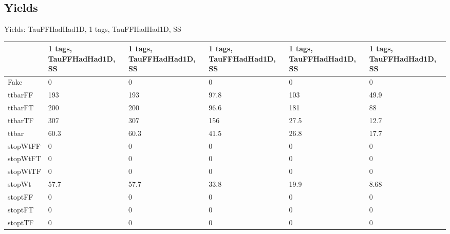 
\subsection{Yields}

\begin{frame}{Yields: TauFFHadHad1D, 1 tags, TauFFHadHad1D, SS}
\begin{center}
  \begin{tabular}{l| >{\centering\let\newline\\\arraybackslash\hspace{0pt}}m{1.4cm}| >{\centering\let\newline\\\arraybackslash\hspace{0pt}}m{1.4cm}| >{\centering\let\newline\\\arraybackslash\hspace{0pt}}m{1.4cm}| >{\centering\let\newline\\\arraybackslash\hspace{0pt}}m{1.4cm}| >{\centering\let\newline\\\arraybackslash\hspace{0pt}}m{1.4cm}}
    & 1 tags, TauFFHadHad1D, SS & 1 tags, TauFFHadHad1D, SS & 1 tags, TauFFHadHad1D, SS & 1 tags, TauFFHadHad1D, SS & 1 tags, TauFFHadHad1D, SS \\
 \hline \hline
    Fake& 0 & 0 & 0 & 0 & 0 \\
 \hline
    ttbarFF& 193 & 193 & 97.8 & 103 & 49.9 \\
 \hline
    ttbarFT& 200 & 200 & 96.6 & 181 & 88 \\
 \hline
    ttbarTF& 307 & 307 & 156 & 27.5 & 12.7 \\
 \hline
    ttbar& 60.3 & 60.3 & 41.5 & 26.8 & 17.7 \\
 \hline
    stopWtFF& 0 & 0 & 0 & 0 & 0 \\
 \hline
    stopWtFT& 0 & 0 & 0 & 0 & 0 \\
 \hline
    stopWtTF& 0 & 0 & 0 & 0 & 0 \\
 \hline
    stopWt& 57.7 & 57.7 & 33.8 & 19.9 & 8.68 \\
 \hline
    stoptFF& 0 & 0 & 0 & 0 & 0 \\
 \hline
    stoptFT& 0 & 0 & 0 & 0 & 0 \\
 \hline
    stoptTF& 0 & 0 & 0 & 0 & 0 \\

\end{tabular}
\end{center}
\end{frame}
